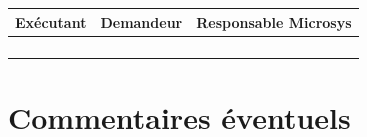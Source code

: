 \documentclass[a4paper, 11pt]{article}
\begin{document}
\begin{center}
	\begin{tabular}{|c|c|c|}
        \hline
        Exécutant & Demandeur & Responsable Microsys \\
        \hline
         \hspace{4.5cm} & \hspace{4.5cm} & \hspace{4.5cm} \\
        &&\\
        &&\\
        &&\\
        \hline
	\end{tabular}
\end{center}

\section{Commentaires éventuels}
\end{document}

